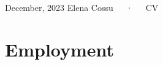 \documentclass[11pt,a4paper,]{awesome-cv}
\begin{document}
\makecvheader

\makecvfooter
  {December, 2023}
    {Elena Cossu~~~·~~~CV}
  {\thepage}





\hypertarget{employment}{%
\section{Employment}\label{employment}}
\end{document}
